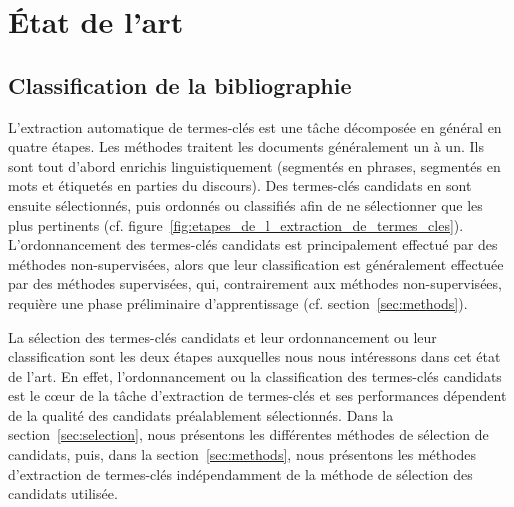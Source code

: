 \chapter{État de l'art}
\label{chap:etat_de_l_art}
  \section{Classification de la bibliographie}
    L'extraction automatique de termes-clés est une tâche décomposée en général
    en quatre étapes. Les méthodes traitent les documents généralement un à un.
    Ils sont tout d'abord enrichis linguistiquement (segmentés en phrases,
    segmentés en mots et étiquetés en parties du discours). Des termes-clés
    candidats en sont ensuite sélectionnés, puis ordonnés ou classifiés afin de
    ne sélectionner que les plus pertinents (cf.
    figure~\ref{fig:etapes_de_l_extraction_de_termes_cles}). L'ordonnancement
    des termes-clés candidats est principalement effectué par des méthodes
    non-supervisées, alors que leur classification est généralement effectuée
    par des méthodes supervisées, qui, contrairement aux méthodes
    non-supervisées, requière une phase préliminaire d'apprentissage (cf.
    section~\ref{sec:methods}).

    La sélection des termes-clés candidats et leur ordonnancement ou leur
    classification sont les deux étapes auxquelles nous nous intéressons dans
    cet état de l'art. En effet, l'ordonnancement ou la classification des
    termes-clés candidats est le c\oe{}ur de la tâche d'extraction de
    termes-clés et ses performances dépendent de la qualité des candidats
    préalablement sélectionnés. Dans la section~\ref{sec:selection}, nous
    présentons les différentes méthodes de sélection de candidats, puis, dans la
    section~\ref{sec:methods}, nous présentons les méthodes d'extraction de
    termes-clés indépendamment de la méthode de sélection des candidats
    utilisée.

